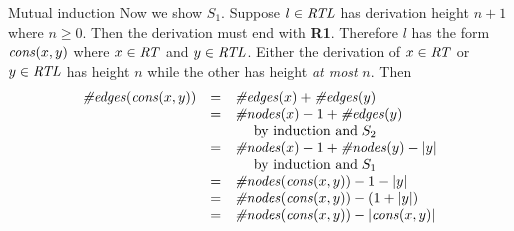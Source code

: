 \documentclass[style=sailor,size=12pt]{powerdot}
\newcommand{\id}[1]{\mbox{\it #1\/}}
\newcommand{\rid}[1]{\mbox{\rm #1}}
\begin{document}
\begin{wideslide}[bm=,toc=]{Mutual induction}
Now we show $S_1$.
Suppose $l\in\id{RTL}$ has derivation height $n+1$ where $n\geq 0$.
Then the derivation must end with {\bf R1}. 
Therefore $l$ has the form $\id{cons}(x,y)$
where $x\in\id{RT}$ and $y\in\id{RTL}$.
Either the derivation of $x\in\id{RT}$ or $y\in\id{RTL}$ has height $n$ while the other 
has height {\em at most\/} $n$.
Then
\begin{displaymath}
\begin{array}{lll}
\id{\#edges}(\id{cons}(x,y)) & = & \id{\#edges}(x) + \id{\#edges}(y) \\
	& = & \id{\#nodes}(x) - 1 + \id{\#edges}(y) \\
 & & \>\>\>\>\>\>\rid{by induction and}\;S_2 \\
	& = & \id{\#nodes}(x) - 1 + \id{\#nodes}(y) - |y| \\
 & & \>\>\>\>\>\>\rid{by induction and}\;S_1 \\
	& = & \id{\#nodes}(\id{cons}(x,y)) - 1 - |y| \\
	& = & \id{\#nodes}(\id{cons}(x,y)) - (1 + |y|) \\
	& = & \id{\#nodes}(\id{cons}(x,y)) - |\id{cons}(x,y)|
\end{array}
\end{displaymath}
\end{wideslide}
\end{document}
